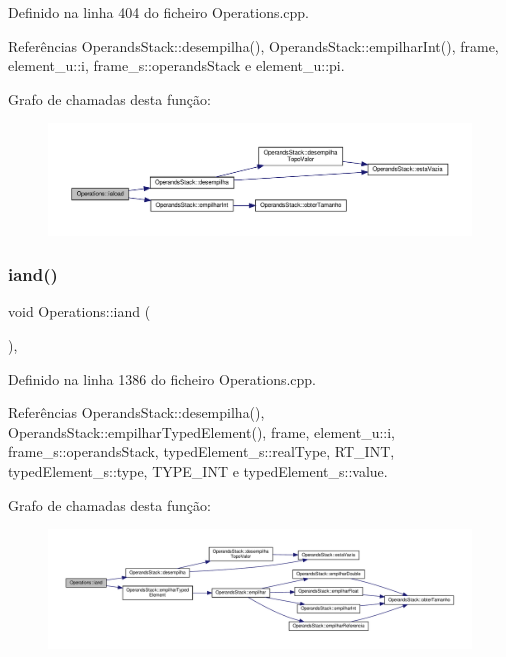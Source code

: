 Definido na linha 404 do ficheiro Operations.\+cpp.



Referências Operands\+Stack\+::desempilha(), Operands\+Stack\+::empilhar\+Int(), frame, element\+\_\+u\+::i, frame\+\_\+s\+::operands\+Stack e element\+\_\+u\+::pi.

Grafo de chamadas desta função\+:\nopagebreak
\begin{figure}[H]
\begin{center}
\leavevmode
\includegraphics[width=350pt]{classOperations_a77f3b4c161fee7fbd6bb89b170400c0c_cgraph}
\end{center}
\end{figure}
\mbox{\label{classOperations_a8761c078ea80677ea82a43ab278e76b5}} 
\subsubsection{\texorpdfstring{iand()}{iand()}}
{\footnotesize\ttfamily void Operations\+::iand (\begin{DoxyParamCaption}{ }\end{DoxyParamCaption})\hspace{0.3cm}{\ttfamily [static]}, {\ttfamily [private]}}



Definido na linha 1386 do ficheiro Operations.\+cpp.



Referências Operands\+Stack\+::desempilha(), Operands\+Stack\+::empilhar\+Typed\+Element(), frame, element\+\_\+u\+::i, frame\+\_\+s\+::operands\+Stack, typed\+Element\+\_\+s\+::real\+Type, R\+T\+\_\+\+I\+NT, typed\+Element\+\_\+s\+::type, T\+Y\+P\+E\+\_\+\+I\+NT e typed\+Element\+\_\+s\+::value.

Grafo de chamadas desta função\+:\nopagebreak
\begin{figure}[H]
\begin{center}
\leavevmode
\includegraphics[width=350pt]{classOperations_a8761c078ea80677ea82a43ab278e76b5_cgraph}
\end{center}
\end{figure}
\mbox{\label{classOperations_aeec162356a6792b1d0ba385f75f443b1}} 
